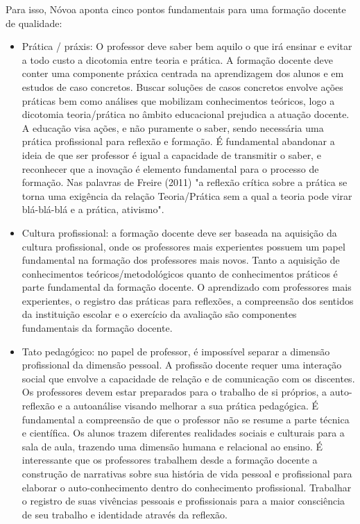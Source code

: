     
	Para isso, Nóvoa aponta cinco pontos fundamentais para uma formação docente de qualidade:
    \begin{itemize}  
	\item Prática / práxis: O professor deve saber bem aquilo o que irá ensinar e evitar a todo custo a dicotomia entre teoria e prática. A formação docente deve conter uma componente práxica centrada na aprendizagem dos alunos e em estudos de caso concretos. Buscar soluções de casos concretos envolve ações práticas bem como análises que mobilizam conhecimentos teóricos, logo a dicotomia teoria/prática no âmbito educacional prejudica a atuação docente. A educação visa ações, e não puramente o saber, sendo necessária uma prática profissional para reflexão e formação. É fundamental abandonar a ideia de que ser professor é igual a capacidade de transmitir o saber, e reconhecer que a inovação é elemento fundamental para o processo de formação. Nas palavras de Freire (2011) "a reflexão crítica sobre a prática se torna uma exigência da relação Teoria/Prática sem a qual a teoria pode virar blá-blá-blá e a prática, ativismo". 
    
    
	\item Cultura profissional: a formação docente deve ser baseada na aquisição da cultura profissional, onde os professores mais experientes possuem um papel fundamental na formação dos professores mais novos. Tanto a aquisição de conhecimentos teóricos/metodológicos quanto de conhecimentos práticos é parte fundamental da formação docente. O aprendizado com professores mais experientes, o registro das práticas para reflexões, a compreensão dos sentidos da instituição escolar e o exercício da avaliação são componentes fundamentais da formação docente.
    
    
	\item Tato pedagógico: no papel de professor, é impossível separar a dimensão profissional da dimensão pessoal. A profissão docente requer uma interação social que envolve a capacidade de relação e de comunicação com os discentes. Os professores devem estar preparados para o trabalho de si próprios, a auto-reflexão e a autoanálise visando melhorar a sua prática pedagógica. É fundamental a compreensão de que o professor não se resume a parte técnica e científica. Os alunos trazem diferentes realidades sociais e culturais para a sala de aula, trazendo uma dimensão humana e relacional ao ensino. É interessante que os professores trabalhem desde a formação docente a construção de narrativas sobre sua história de vida pessoal e profissional para elaborar o auto-conhecimento dentro do conhecimento profissional. Trabalhar o registro de suas vivências pessoais e profissionais para a maior consciência de seu trabalho e identidade através da reflexão.
    

\end{itemize}

